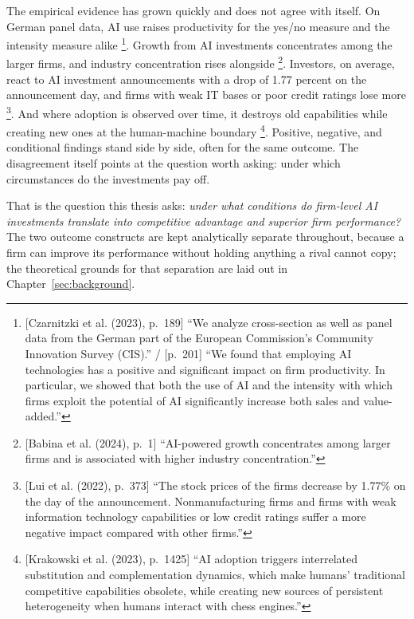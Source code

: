 The empirical evidence has grown quickly and does not agree with itself. On German
panel data, AI use raises productivity for the yes/no measure and the intensity measure
alike \parencite[pp.~189, 201]{czarnitzki2023artificial}\footnote{[Czarnitzki et al.
(2023), p.~189] ``We analyze cross-section as well as panel data from the German part of
the European Commission's Community Innovation Survey (CIS).'' / [p.~201] ``We found
that employing AI technologies has a positive and significant impact
on firm productivity. In particular, we showed that both the use of AI and the intensity
with which firms exploit the potential of AI significantly increase both sales and
value-added.''}. Growth from AI investments concentrates among
the larger firms, and industry concentration rises
alongside \parencite[p.~1]{babina2024artificial}\footnote{[Babina et al. (2024),
p.~1] ``AI-powered growth concentrates among larger firms and is associated with higher
industry concentration.''}. Investors, on average, react to AI investment announcements
with a drop of 1.77 percent on the announcement day, and firms with weak IT bases or
poor credit ratings lose more \parencite[p.~373]{lui2022impact}\footnote{[Lui et al.
(2022), p.~373] ``The stock prices of the firms decrease by 1.77\% on the day of the
announcement. Nonmanufacturing firms and firms with weak information technology
capabilities or low credit ratings suffer a more negative impact compared with other
firms.''}. And where adoption is observed over time, it destroys old capabilities while
creating new ones at the human-machine
boundary \parencite[p.~1425]{krakowski2023artificial}\footnote{[Krakowski et al.
(2023), p.~1425] ``AI adoption triggers interrelated substitution and complementation
dynamics, which make humans' traditional competitive capabilities obsolete, while
creating new sources of persistent heterogeneity when humans interact with chess
engines.''}. Positive, negative, and conditional findings stand side by side, often for
the same outcome. The disagreement itself points at the question worth asking: under which
circumstances do the investments pay off.

That is the question this thesis asks: \emph{under what conditions do firm-level AI
investments translate into competitive advantage and superior firm performance?} The
two outcome constructs are kept analytically separate throughout, because a firm can
improve its performance without holding anything a rival cannot copy; the theoretical
grounds for that separation are laid out in Chapter~\ref{sec:background}.

